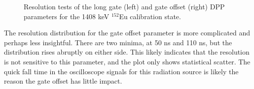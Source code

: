 \begin{figure}[t]
\centering
{}
\caption{\label{fig:resolution_plots}Resolution tests of the long gate (left) and gate offset (right) DPP parameters for the 1408 keV $^{152}$Eu calibration state.}
\end{figure}

The resolution distribution for the gate offset parameter is more complicated and perhaps less insightful. There are two minima, at 50 ns and 110 ns, but the distribution rises abruptly on either side. This likely indicates that the resolution is not sensitive to this parameter, and the plot only shows statistical scatter. The quick fall time in the oscilloscope signals for this radiation source is likely the reason the gate offset has little impact.

